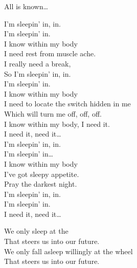 All is known… \\





I'm sleepin' in, in. \\
I'm sleepin' in. \\

I know within my body \\
I need rest from muscle ache. \\
I really need a break, \\
So I'm sleepin' in, in. \\
I'm sleepin' in. \\

I know within my body \\
I need to locate the switch hidden in me \\
Which will turn me off, off, off. \\
I know within my body, I need it. \\

I need it, need it… \\

I'm sleepin' in, in. \\
I'm sleepin' in… \\

I know within my body \\
I've got sleepy appetite. \\
Pray the darkest night. \\
I'm sleepin' in, in. \\
I'm sleepin' in. \\

I need it, need it… \\





We only sleep at the  \\
That steers us into our future. \\
We only fall asleep willingly at the wheel \\
That steers us into our future. \\


